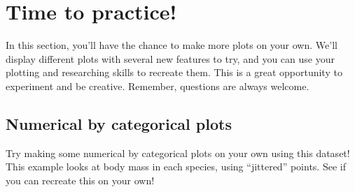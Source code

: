 \documentclass[
  letterpaper,
  DIV=11,
  numbers=noendperiod]{scrreprt}
\newenvironment{Shaded}{\begin{snugshade}}{\end{snugshade}}
\newcommand{\AttributeTok}[1]{\textcolor[rgb]{0.40,0.45,0.13}{#1}}
\newcommand{\CommentTok}[1]{\textcolor[rgb]{0.37,0.37,0.37}{#1}}
\newcommand{\DecValTok}[1]{\textcolor[rgb]{0.68,0.00,0.00}{#1}}
\newcommand{\FunctionTok}[1]{\textcolor[rgb]{0.28,0.35,0.67}{#1}}
\newcommand{\NormalTok}[1]{\textcolor[rgb]{0.00,0.23,0.31}{#1}}
\newcommand{\SpecialCharTok}[1]{\textcolor[rgb]{0.37,0.37,0.37}{#1}}
\newcommand{\StringTok}[1]{\textcolor[rgb]{0.13,0.47,0.30}{#1}}
\begin{document}
\begin{tcolorbox}
\begin{Shaded}
\end{Shaded}

\end{tcolorbox}

\hypertarget{time-to-practice}{%
\section{Time to practice!}\label{time-to-practice}}

In this section, you'll have the chance to make more plots on your own.
We'll display different plots with several new features to try, and you
can use your plotting and researching skills to recreate them. This is a
great opportunity to experiment and be creative. Remember, questions are
always welcome.

\hypertarget{numerical-by-categorical-plots}{%
\subsection{Numerical by categorical
plots}\label{numerical-by-categorical-plots}}

Try making some numerical by categorical plots on your own using this
dataset! This example looks at body mass in each species, using
``jittered'' points. See if you can recreate this on your own!
\end{document}
